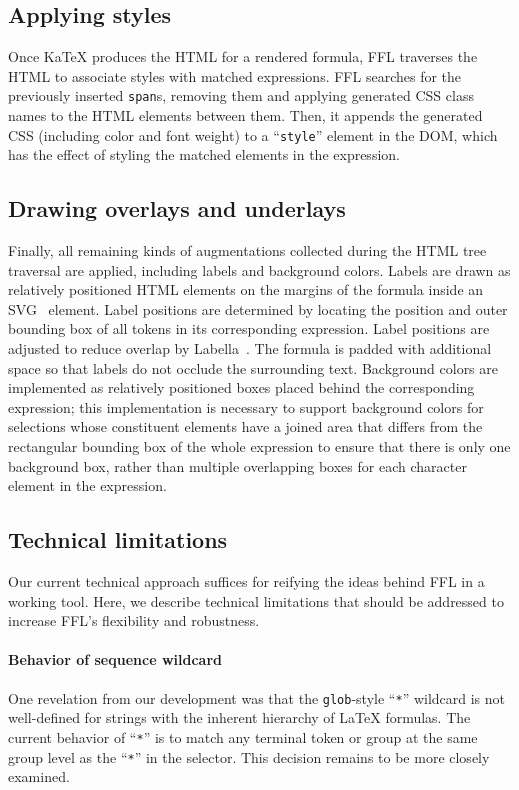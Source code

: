 \subsection{Applying styles}
Once KaTeX produces the HTML for a rendered formula, FFL traverses the HTML to associate styles with matched expressions. FFL searches for the previously inserted \texttt{span}s, removing them and applying generated CSS class names to the HTML elements between them. Then, it appends the generated CSS (including color and font weight) to a ``\texttt{style}'' element in the DOM, which has the effect of styling the matched elements in the expression.

\subsection{Drawing overlays and underlays}\label{sec:overlays}
Finally, all remaining kinds of augmentations collected during the HTML tree traversal are applied, including labels and background colors. Labels are drawn as relatively positioned HTML elements on the margins of the formula inside an SVG~\cite{tool:svg} element. Label positions are determined by locating the position and outer bounding box of all tokens in its corresponding expression. Label positions are adjusted to reduce overlap by Labella~\cite{tool:labella}. The formula is padded with additional space so that labels do not occlude the surrounding text. Background colors are implemented as relatively positioned boxes placed behind the corresponding expression; this implementation is necessary to support background colors for selections whose constituent elements have a joined area that differs from the rectangular bounding box of the whole expression to ensure that there is only one background box, rather than multiple overlapping boxes for each character element in the expression.

\subsection{Technical limitations}\label{tech-limitations}

Our current technical approach suffices for reifying the ideas behind FFL in a working tool. Here, we describe technical limitations that should be addressed to increase FFL's flexibility and robustness.

\paragraph{Behavior of sequence wildcard} One revelation from our development was that the \texttt{glob}-style ``\texttt{*}'' wildcard is not well-defined for strings with the inherent hierarchy of LaTeX formulas. The current behavior of ``\texttt{*}'' is to match any terminal token or group at the same group level as the ``\texttt{*}'' in the selector. This decision remains to be more closely examined.

